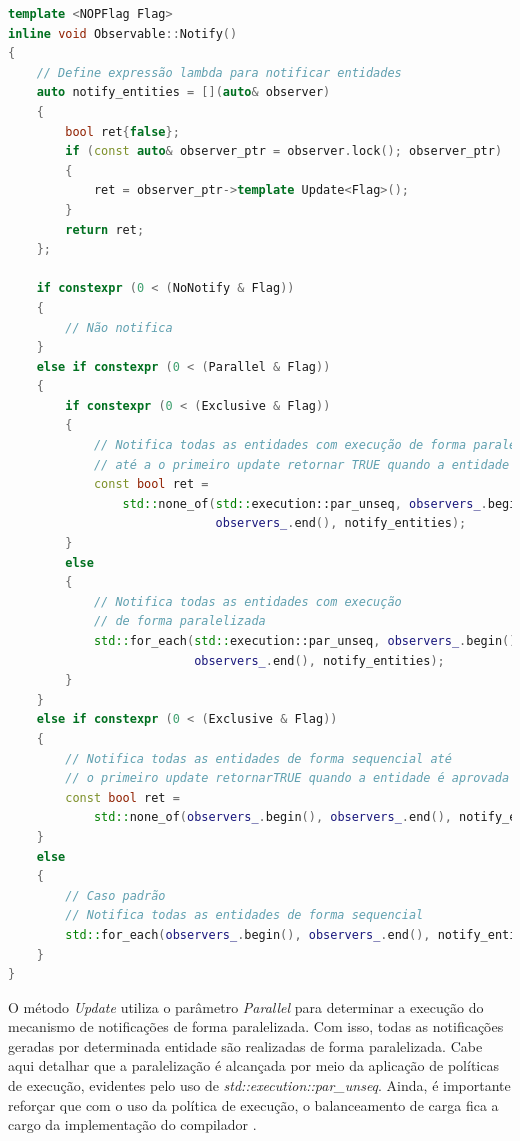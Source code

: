 \begin{lstlisting}[language=C++,
caption = {Método \textit{Notify} da classe \textit{Observable} no \textit{Framework} PON C++ 4.0},
source = {Autoria própria}, float=htb,
label = {cod:observable_cpp}]
template <NOPFlag Flag>
inline void Observable::Notify()
{
    // Define expressão lambda para notificar entidades
    auto notify_entities = [](auto& observer)
    {
        bool ret{false};
        if (const auto& observer_ptr = observer.lock(); observer_ptr)
        {
            ret = observer_ptr->template Update<Flag>();
        }
        return ret;
    };

    if constexpr (0 < (NoNotify & Flag))
    {
        // Não notifica
    }
    else if constexpr (0 < (Parallel & Flag))
    {
        if constexpr (0 < (Exclusive & Flag))
        {
            // Notifica todas as entidades com execução de forma paralelizada 
            // até a o primeiro update retornar TRUE quando a entidade é aprovada
            const bool ret =
                std::none_of(std::execution::par_unseq, observers_.begin(),
                             observers_.end(), notify_entities);
        }
        else
        {
            // Notifica todas as entidades com execução
            // de forma paralelizada
            std::for_each(std::execution::par_unseq, observers_.begin(),
                          observers_.end(), notify_entities);
        }
    }
    else if constexpr (0 < (Exclusive & Flag))
    {
        // Notifica todas as entidades de forma sequencial até 
        // o primeiro update retornarTRUE quando a entidade é aprovada
        const bool ret =
            std::none_of(observers_.begin(), observers_.end(), notify_entities);
    }
    else
    {
        // Caso padrão
        // Notifica todas as entidades de forma sequencial
        std::for_each(observers_.begin(), observers_.end(), notify_entities);
    }
}
\end{lstlisting}

O método \textit{Update} utiliza o parâmetro \textit{Parallel} para determinar a
execução do mecanismo de notificações de forma paralelizada. Com isso, todas as
notificações geradas por determinada entidade são realizadas de forma
paralelizada. Cabe aqui detalhar que a paralelização é alcançada por meio da
aplicação de políticas de execução, evidentes pelo uso de
\textit{std::execution::par\_unseq}. Ainda, é importante reforçar que com o uso
da política de execução, o balanceamento de carga fica a cargo da implementação
do compilador \cite{oneal_2018}.

